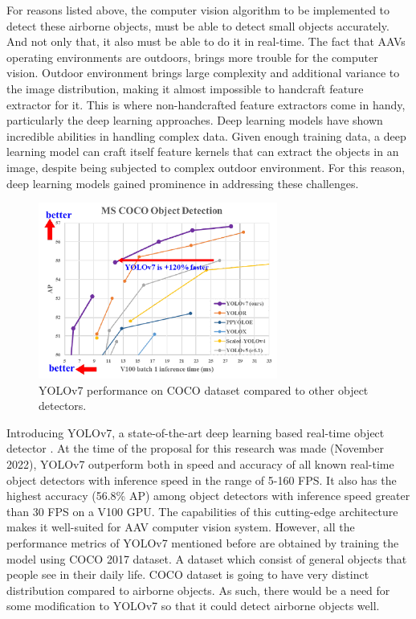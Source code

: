     For reasons listed above, the computer vision algorithm to be implemented to detect these airborne objects, 
    must be able to detect small objects accurately. And not only that, it also must be able to do it in real-time.
    The fact that AAVs operating environments are outdoors, brings more trouble for the computer
    vision. Outdoor environment brings large complexity and additional variance to the image distribution, 
    making it almost impossible to handcraft feature extractor for it. This is where non-handcrafted
    feature extractors come in handy, particularly the deep learning approaches. Deep learning models
    have shown incredible abilities in handling complex data. Given enough training data, a deep learning
    model can craft itself feature kernels that can extract the objects in an image, despite being subjected
    to complex outdoor environment. For this reason, deep learning models gained prominence in addressing
    these challenges. 
    \begin{figure} [H]
        \centering
        \includegraphics[width=0.7\textwidth]{figures/yolov7-coco.png}
        \caption{YOLOv7 performance on COCO dataset compared to other object detectors.}
        \label{fig:yolov7-coco}
    \end{figure}

    Introducing YOLOv7, a state-of-the-art deep learning based real-time object detector \parencite{yolov7}.
    At the time of the proposal for this research was made (November 2022),
    YOLOv7 outperform both in speed and accuracy of all known real-time object detectors 
    with inference speed in the range of 5-160 FPS. It also has the highest accuracy (56.8\% AP) among
    object detectors with inference speed greater than 30 FPS on a V100 GPU. The capabilities of this cutting-edge architecture
    makes it well-suited for AAV computer vision system. However, all the performance metrics of YOLOv7
    mentioned before are obtained by training the model using COCO 2017 dataset. A dataset which 
    consist of general objects that people see in their daily life. COCO dataset is going to have
    very distinct distribution compared to airborne objects. As such, there would be a need for
    some modification to YOLOv7 so that it could detect airborne objects well.

